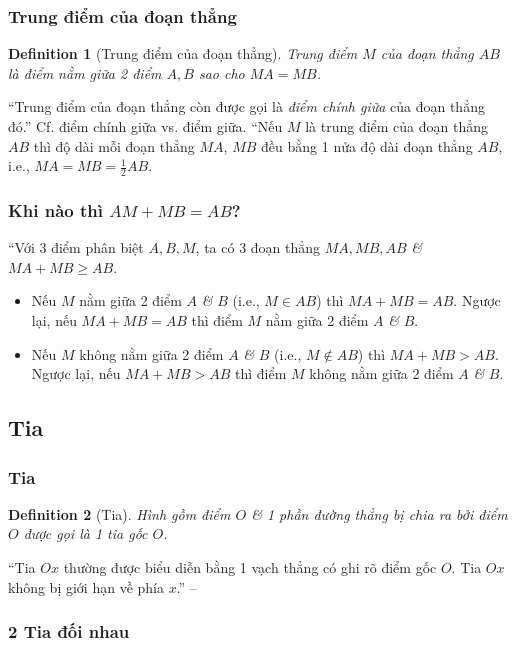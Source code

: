 \documentclass{article}
\numberwithin{equation}{section}
\newtheorem{definition}{Definition}[section]
\begin{document}
\subsubsection{Trung điểm của đoạn thẳng}

\begin{definition}[Trung điểm của đoạn thẳng]
	\emph{Trung điểm $M$} của đoạn thẳng $AB$ là điểm nằm giữa 2 điểm $A,B$ sao cho $MA = MB$.
\end{definition}
``Trung điểm của đoạn thẳng còn được gọi là \textit{điểm chính giữa} của đoạn thẳng đó.'' Cf. điểm chính giữa vs. điểm giữa. ``Nếu $M$ là trung điểm của đoạn thẳng $AB$ thì độ dài mỗi đoạn thẳng $MA$, $MB$ đều bằng 1 nửa độ dài đoạn thẳng $AB$, i.e., $MA = MB = \frac{1}{2}AB$.

\subsubsection{Khi nào thì $AM + MB = AB$?}
``Với 3 điểm phân biệt $A,B,M$, ta có 3 đoạn thẳng $MA,MB,AB$ \textit{\&} $MA + MB\ge AB$.
\begin{itemize}
	\item Nếu $M$ nằm giữa 2 điểm $A$ \textit{\&} $B$ (i.e., $M\in AB$) thì $MA + MB = AB$. Ngược lại, nếu $MA + MB = AB$ thì điểm $M$ nằm giữa 2 điểm $A$ \textit{\&} $B$.
	\item Nếu $M$ không nằm giữa 2 điểm $A$ \textit{\&} $B$ (i.e., $M\notin AB$) thì $MA + MB > AB$. Ngược lại, nếu $MA + MB > AB$ thì điểm $M$ không nằm giữa 2 điểm $A$ \textit{\&} $B$.
\end{itemize}

\subsection{Tia}

\subsubsection{Tia}

\begin{definition}[Tia]
	Hình gồm điểm $O$ \textit{\&} 1 phần đường thẳng bị chia ra bởi điểm $O$ được gọi là 1 \textit{tia gốc $O$}.
\end{definition}
``Tia $Ox$ thường được biểu diễn bằng 1 vạch thẳng có ghi rõ điểm gốc $O$. Tia $Ox$ không bị giới hạn về phía $x$.'' -- \cite[p. 89]{Thai_Anh_Dat_Ha_Loan_Nam_Quang_Toan_6_tap_2}

\subsubsection{2 Tia đối nhau}
\end{document}
